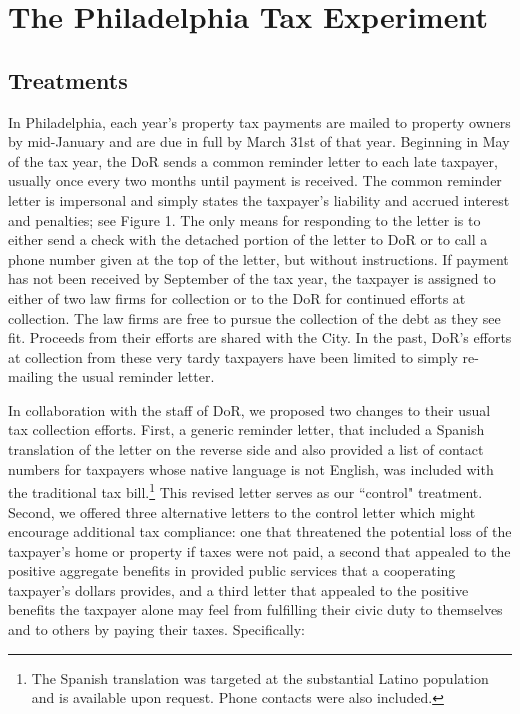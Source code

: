 \documentclass[12pt,titlepage]{article}
\begin{document}
\section{The Philadelphia Tax Experiment}

\subsection{Treatments}

In Philadelphia, each year's property tax payments are mailed to
property owners by mid-January and are due in full by March 31st of
that year.  Beginning in May of the tax year, the DoR sends a common
reminder letter to each late taxpayer, usually once every two months
until payment is received.  The common reminder letter is impersonal
and simply states the taxpayer's liability and accrued interest and
penalties; see Figure 1.  The only means for responding to the letter
is to either send a check with the detached portion of the letter to
DoR or to call a phone number given at the top of the letter, but
without instructions.  If payment has not been received by September
of the tax year, the taxpayer is assigned
to either of two law firms for collection or to the DoR
for continued efforts at collection.  The law firms are free to pursue
the collection of the debt as they see fit.  Proceeds from their
efforts are shared with the City.  In the past, DoR's efforts at
collection from these very tardy taxpayers have been limited to simply
re-mailing the usual reminder letter.

In collaboration with the staff of DoR, we proposed two changes to
their usual tax collection efforts.  First, a generic reminder letter,
that included a Spanish translation of the letter on the reverse side
and also provided a list of contact numbers for taxpayers whose native
language is not English, was included with the traditional tax
bill.\footnote{The Spanish translation was targeted at the substantial
  Latino population and is available upon request. Phone contacts were
  also included.}  This revised letter serves as our ``control"
treatment.  Second, we offered three alternative letters to the
control letter which might encourage additional tax compliance: one
that threatened the potential loss of the taxpayer's home or property
if taxes were not paid, a second that appealed to the positive
aggregate benefits in provided public services that a cooperating
taxpayer's dollars provides, and a third letter that appealed to the
positive benefits the taxpayer alone may feel from fulfilling their
civic duty to themselves and to others by paying their
taxes. Specifically:
\end{document}
